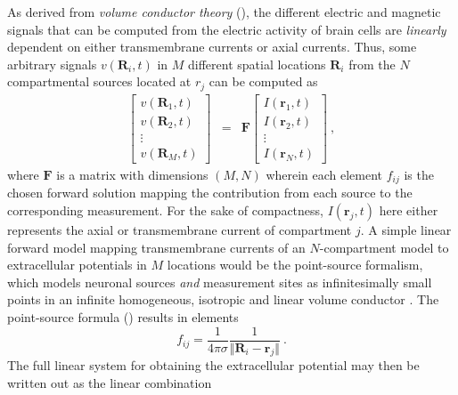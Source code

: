 As derived from \textit{volume conductor theory} (),
the different electric and magnetic signals that can be computed from the electric activity of brain cells are \textit{linearly} dependent on either transmembrane currents or axial currents.
Thus, some arbitrary signals $v(\mathbf{R}_i, t)$ in $M$ different spatial locations $\mathbf{R}_i$ from the $N$ compartmental sources located at $r_j$ can be computed as
%
\begin{eqnarray}
\begin{bmatrix}
v(\mathbf{R}_1, t) \\
v(\mathbf{R}_2, t) \\
\vdots \\
v(\mathbf{R}_M, t)
\end{bmatrix}
&=& \mathbf{F}
\begin{bmatrix}
I(\mathbf{r}_1, t) \\
I(\mathbf{r}_2, t) \\
\vdots \\
I(\mathbf{r}_N, t)
\end{bmatrix} ~,
\end{eqnarray}
%
where $\mathbf{F}$ is a matrix with dimensions $(M, N)$ wherein each element $f_{ij}$ is the chosen forward solution mapping the contribution from each source to the corresponding measurement.
For the sake of compactness, $I(\mathbf{r}_j, t)$ here either represents the axial or transmembrane current of compartment $j$.
A simple linear forward model mapping transmembrane currents of an $N$-compartment model to extracellular potentials in $M$ locations would be the point-source formalism,
which models neuronal sources \textit{and} measurement sites as infinitesimally small points in an infinite homogeneous, isotropic and linear volume conductor .
The point-source formula () results in elements
%
\begin{equation}
f_{ij} = \frac{1}{4\pi\sigma}\frac{1}{\Vert\mathbf{R}_i - \mathbf{r}_j\Vert}  ~.
\end{equation}
%
The full linear system for obtaining the extracellular potential may then be written out as the linear combination
%
